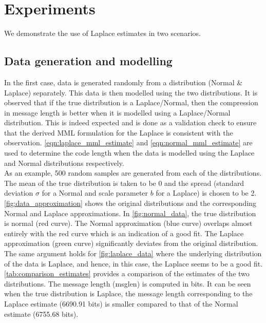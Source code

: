 \documentclass[wcp]{jmlr}
\begin{document}
\section{Experiments}
We demonstrate the use of Laplace estimates in two scenarios. 

\subsection{Data generation and modelling}
In the first case, data is generated randomly from a distribution (Normal \& Laplace) 
separately. This data is then modelled using the two distributions.
It is observed that if the true distribution is a Laplace/Normal, then the
compression in message length is better when it is modelled using a Laplace/Normal
distribution. This is indeed expected and is done as a validation check to ensure that 
the derived MML formulation for the Laplace is consistent with the observation.
\eqref{eqn:laplace_mml_estimate} and \eqref{eqn:normal_mml_estimate} are used to determine
the code length when the data is modelled using the Laplace and Normal distributions
respectively. \\

As an example, 500 random samples are generated from each of the distributions.
The mean of the true distribution is taken to be 0 and the spread (standard
deviation $\sigma$ for a Normal and scale parameter $b$ for a Laplace) is
chosen to be 2. \autoref{fig:data_approximation} shows the original distributions
and the corresponding Normal and Laplace approximations. In \autoref{fig:normal_data},
the true distribution is normal (red curve). The Normal approximation (blue curve)
overlaps almost entirely with the red curve which is an indication of a good fit.
The Laplace approximation (green curve) significantly deviates from the original
distribution. The same argument holds for \autoref{fig:laplace_data} where the
underlying distribution of the data is Laplace, and hence, in this case, the Laplace
seems to be a good fit. \\

\autoref{tab:comparison_estimates} provides a comparison of the estimates of the
two distributions. The message length (msglen) is computed in bits. It can be seen
when the true distribution is Laplace, the message length corresponding to the Laplace 
estimate (6690.91 bits) is smaller compared to that of the Normal estimate (6755.68 bits).
\end{document}
